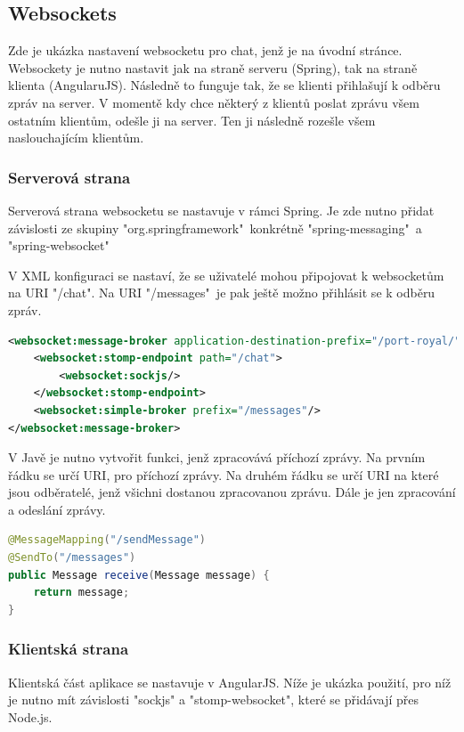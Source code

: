 \documentclass[czech,master,public,dept460,male,cpdeclaration,twoside]{diploma}
\begin{document}
\subsection{Websockets}
Zde je ukázka nastavení websocketu pro chat, jenž je na úvodní stránce. Websockety je nutno nastavit jak na straně serveru (Spring), tak na straně klienta (AngularuJS). Následně to funguje tak, že se klienti přihlašují k odběru zpráv na server. V momentě kdy chce některý z klientů poslat zprávu všem ostatním klientům, odešle ji na server. Ten ji následně rozešle všem naslouchajícím klientům.

\subsubsection{Serverová strana}
Serverová strana websocketu se nastavuje v rámci Spring. Je zde nutno přidat závislosti ze skupiny "org.springframework"~konkrétně "spring-messaging"~a "spring-websocket"

V XML konfiguraci se nastaví, že se uživatelé mohou připojovat k websocketům na URI "/chat". Na URI "/messages"~je pak ještě možno přihlásit se k odběru zpráv.
\begin{lstlisting}[language=XML, caption=XML konfigurace websocketu]
<websocket:message-broker application-destination-prefix="/port-royal/">
    <websocket:stomp-endpoint path="/chat">
        <websocket:sockjs/>
    </websocket:stomp-endpoint>
    <websocket:simple-broker prefix="/messages"/>
</websocket:message-broker>
\end{lstlisting}

V Javě je nutno vytvořit funkci, jenž zpracovává příchozí zprávy. Na prvním řádku se určí URI, pro příchozí zprávy. Na druhém řádku se určí URI na které jsou odběratelé, jenž všichni dostanou zpracovanou zprávu. Dále je jen zpracování a odeslání zprávy.

\begin{lstlisting}[language=Java, caption=Implementace websocketu v javě]
@MessageMapping("/sendMessage")
@SendTo("/messages")
public Message receive(Message message) {
    return message;
}
\end{lstlisting}

\subsubsection{Klientská strana}
Klientská část aplikace se nastavuje v AngularJS. Níže je ukázka použití, pro níž je nutno mít závislosti "sockjs" a "stomp-websocket", které se přidávají přes Node.js.
\end{document}
